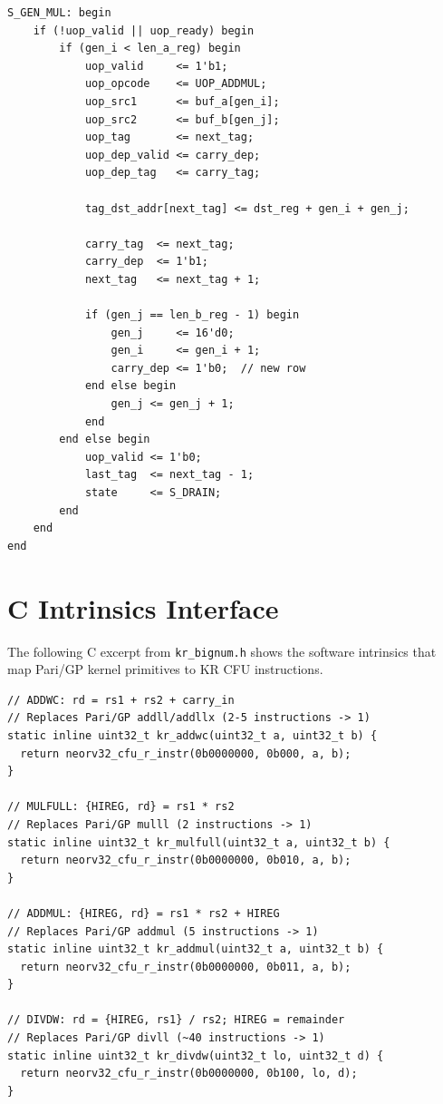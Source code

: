\documentclass[11pt,a4paper]{article}
\begin{document}
\begin{lstlisting}[style=verilog,caption={Schoolbook multiply micro-op generation from \texttt{kr\_decomp\_engine.v}.},label=lst:mpmul-gen]
S_GEN_MUL: begin
    if (!uop_valid || uop_ready) begin
        if (gen_i < len_a_reg) begin
            uop_valid     <= 1'b1;
            uop_opcode    <= UOP_ADDMUL;
            uop_src1      <= buf_a[gen_i];
            uop_src2      <= buf_b[gen_j];
            uop_tag       <= next_tag;
            uop_dep_valid <= carry_dep;
            uop_dep_tag   <= carry_tag;

            tag_dst_addr[next_tag] <= dst_reg + gen_i + gen_j;

            carry_tag  <= next_tag;
            carry_dep  <= 1'b1;
            next_tag   <= next_tag + 1;

            if (gen_j == len_b_reg - 1) begin
                gen_j     <= 16'd0;
                gen_i     <= gen_i + 1;
                carry_dep <= 1'b0;  // new row
            end else begin
                gen_j <= gen_j + 1;
            end
        end else begin
            uop_valid <= 1'b0;
            last_tag  <= next_tag - 1;
            state     <= S_DRAIN;
        end
    end
end
\end{lstlisting}


\section{C Intrinsics Interface}
\label{app:intrinsics}

The following C excerpt from \texttt{kr\_bignum.h} shows the software
intrinsics that map Pari/GP kernel primitives to KR CFU instructions.

\begin{lstlisting}[style=cstyle,caption={KR Bignum intrinsics mapping Pari/GP primitives to CFU instructions.},label=lst:intrinsics]
// ADDWC: rd = rs1 + rs2 + carry_in
// Replaces Pari/GP addll/addllx (2-5 instructions -> 1)
static inline uint32_t kr_addwc(uint32_t a, uint32_t b) {
  return neorv32_cfu_r_instr(0b0000000, 0b000, a, b);
}

// MULFULL: {HIREG, rd} = rs1 * rs2
// Replaces Pari/GP mulll (2 instructions -> 1)
static inline uint32_t kr_mulfull(uint32_t a, uint32_t b) {
  return neorv32_cfu_r_instr(0b0000000, 0b010, a, b);
}

// ADDMUL: {HIREG, rd} = rs1 * rs2 + HIREG
// Replaces Pari/GP addmul (5 instructions -> 1)
static inline uint32_t kr_addmul(uint32_t a, uint32_t b) {
  return neorv32_cfu_r_instr(0b0000000, 0b011, a, b);
}

// DIVDW: rd = {HIREG, rs1} / rs2; HIREG = remainder
// Replaces Pari/GP divll (~40 instructions -> 1)
static inline uint32_t kr_divdw(uint32_t lo, uint32_t d) {
  return neorv32_cfu_r_instr(0b0000000, 0b100, lo, d);
}
\end{lstlisting}
\end{document}
